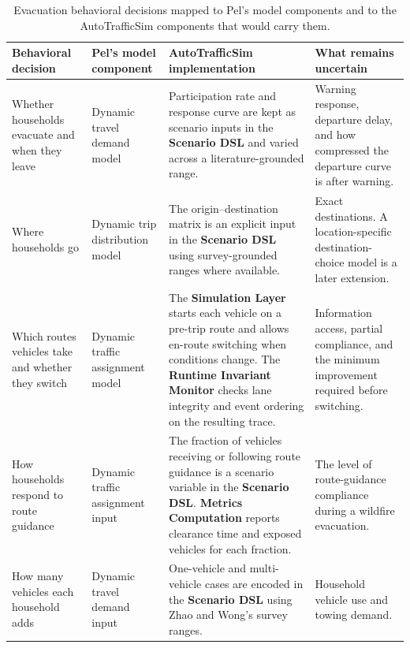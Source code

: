 \begin{bibunit}[plainnat]
\begin{table}[H]
\centering
\renewcommand{\arraystretch}{1.3}
\caption{Evacuation behavioral decisions mapped to Pel's model components and to the AutoTrafficSim components that would carry them.}
\label{tab:q2_pel_mapping}
\begin{tabularx}{\textwidth}{
  >{\raggedright\arraybackslash}p{2.8cm}
  >{\raggedright\arraybackslash}p{3.0cm}
  >{\raggedright\arraybackslash}X
  >{\raggedright\arraybackslash}p{3.5cm}}
\toprule
\textbf{Behavioral decision} &
\textbf{Pel's model component} &
\textbf{AutoTrafficSim implementation} &
\textbf{What remains uncertain} \\
\midrule
Whether households evacuate and when they leave &
Dynamic travel demand model &
Participation rate and response curve are kept as scenario inputs in the
\textbf{Scenario DSL} and varied across a literature-grounded range. &
Warning response, departure delay, and how compressed the departure curve is
after warning. \\
\midrule
Where households go &
Dynamic trip distribution model &
The origin--destination matrix is an explicit input in the
\textbf{Scenario DSL} using survey-grounded ranges where available. &
Exact destinations. A location-specific destination-choice model is a later
extension. \\
\midrule
Which routes vehicles take and whether they switch &
Dynamic traffic assignment model &
The \textbf{Simulation Layer} starts each vehicle on a pre-trip route and
allows en-route switching when conditions change. The
\textbf{Runtime Invariant Monitor} checks lane integrity and event ordering
on the resulting trace. &
Information access, partial compliance, and the minimum improvement
required before switching. \\
\midrule
How households respond to route guidance &
Dynamic traffic assignment input &
The fraction of vehicles receiving or following route guidance is a
scenario variable in the \textbf{Scenario DSL}. \textbf{Metrics
Computation} reports clearance time and exposed vehicles for each
fraction. &
The level of route-guidance compliance during a wildfire evacuation. \\
\midrule
How many vehicles each household adds &
Dynamic travel demand input &
One-vehicle and multi-vehicle cases are encoded in the
\textbf{Scenario DSL} using Zhao and Wong's survey ranges. &
Household vehicle use and towing demand. \\
\bottomrule
\end{tabularx}
\end{table}


\end{bibunit}
